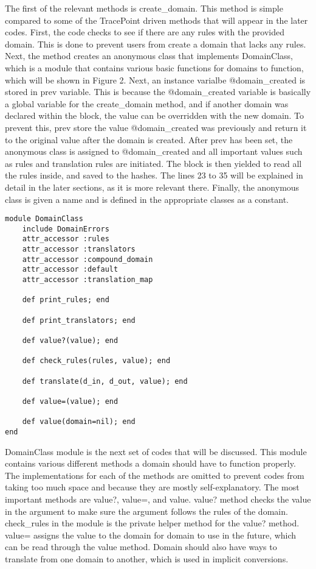 The first of the relevant methods is create\_domain.  This method is simple compared to some of the TracePoint driven methods that will appear in the later codes.  First, the code checks to see if there are any rules with the provided domain.  This is done to prevent users from create a domain that lacks any rules.  Next, the method creates an anonymous class that implements DomainClass, which is a module that contains various basic functions for domains to function, which will be shown in Figure 2. Next, an instance varialbe @domain\_created is stored in prev variable.  This is because the @domain\_created variable is basically a global variable for the create\_domain method, and if another domain was declared within the block, the value can be overridden with the new domain.  To prevent this, prev store the value @domain\_created was previously and return it to the original value after the domain is created.  After prev has been set, the anonymous class is assigned to @domain\_created and all important values such as rules and translation rules are initiated.  The block is then yielded to read all the rules inside, and saved to the hashes. The lines 23 to 35 will be explained in detail in the later sections, as it is more relevant there.  Finally, the anonymous class is given a name and is defined in the appropriate classes as a constant. 

\begin{lstlisting}[caption={Domain module}]
module DomainClass
    include DomainErrors
    attr_accessor :rules
    attr_accessor :translators
    attr_accessor :compound_domain
    attr_accessor :default
    attr_accessor :translation_map

    def print_rules; end

    def print_translators; end

    def value?(value); end

    def check_rules(rules, value); end

    def translate(d_in, d_out, value); end

    def value=(value); end

    def value(domain=nil); end
end
\end{lstlisting}

DomainClass module is the next set of codes that will be discussed.  This module contains various different methods a domain should have to function properly.  The implementations for each of the methods are omitted to prevent codes from taking too much space and because they are mostly self-explanatory.  The most important methods are value?, value=, and value.  value? method checks the value in the argument to make sure the argument follows the rules of the domain.  check\_rules in the module is the private helper method for the value? method.  value= assigns the value to the domain for domain to use in the future, which can be read through the value method.  Domain should also have ways to translate from one domain to another, which is used in implicit conversions.


